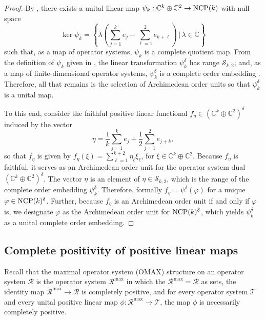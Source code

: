 \documentclass{amsart}
\theoremstyle{definition}
\theoremstyle{remark}
\newcommand\osr{{\mathcal R}}
\newcommand\oss{{\mathcal S}}
\newcommand\ost{{\mathcal T}}
\numberwithin{equation}{section}
\begin{document}
\begin{proof} By
\cite[Theorem 5.1]{farenick--kavruk--paulsen--todorov2018}, 
there exists a unital linear map 
$\psi_k:\mathbb C^k\oplus\mathbb C^2\rightarrow\mbox{\textrm{NCP}}(k)$ 
with null space
\[
\ker\psi_k=\left\{\lambda\left(\sum_{j=1}^k e_j - \sum_{\ell=1}^2 e_{k+\ell}\right)\,|\,\lambda\in\mathbb C\right\}
\]
such that, as a map of operator systems, $\psi_k$ is a complete quotient map. 
From the definition of $\psi_k$ given in \cite[Theorem 5.1]{farenick--kavruk--paulsen--todorov2018}, the linear transformation
$\psi_k^\delta$ has range $\oss_{k,2}$; and, as a map of 
finite-dimensional operator systems, $\psi_k^\delta$ is a complete order embedding \cite[Proposition 1.15]{farenick--paulsen2012}. Therefore, all
that remains is the selection of Archimedean order units so that $\psi_k^\delta$ is a unital map.

To this end,
consider the faithful positive linear functional $f_\eta\in(\mathbb C^k\oplus\mathbb C^2)^\delta$ induced 
by the vector 
\[
\eta=\frac{1}{k}\sum_{j=1}^k e_j + \frac{1}{2}\sum_{j=1}^2 e_{j+k},
\]
so that $f_\eta$ is given by $f_\eta(\xi)=\displaystyle\sum_{\ell=1}^{k+2}\eta_\ell\xi_\ell$, for $\xi\in \mathbb C^k\oplus\mathbb C^2$. Because $f_\eta$ is faithful, it serves as an
Archimedean order unit for the operator system dual $(\mathbb C^k\oplus\mathbb C^2)^\delta$. The vector $\eta$ is an element of $\eta\in \oss_{k,2}$, 
which is the range of the complete order embedding $\psi_k^\delta$. Therefore, formally
$f_\eta=\psi^\delta(\varphi)$ for a unique $\varphi\in\mbox{\textrm{NCP}}(k)^\delta$. Further, because $f_\eta$ is an Archimedean order unit if and only if $\varphi$ is, 
we designate $\varphi$ as the Archimedean order unit for $\mbox{\textrm{NCP}}(k)^\delta$, which yields $\psi_k^\delta$ as a unital complete order embedding.
\end{proof}

\subsection{Complete positivity of positive linear maps}

Recall that the maximal operator system (OMAX) structure on an operator system $\osr$ is the operator system $\osr^{\textrm{max}}$ in which
the $\osr^{\textrm{max}}=\osr$ as sets, the identity map $\osr^{\textrm{max}}\rightarrow\osr$ is completely positive, and for every operator system 
$\ost $ and every unital positive linear
map $\phi:\osr^{\textrm{max}}\rightarrow\ost$, the map $\phi$ is necessarily completely positive.
\end{document}
